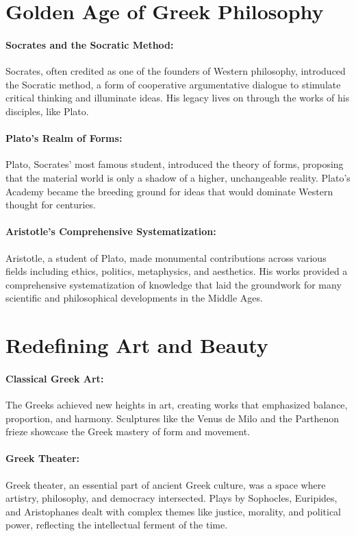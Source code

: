 \documentclass[a4paper,12pt]{book}
\begin{document}
\section*{Golden Age of Greek Philosophy}

\paragraph{Socrates and the Socratic Method:}
Socrates, often credited as one of the founders of Western philosophy, introduced the Socratic method, a form of cooperative argumentative dialogue to stimulate critical thinking and illuminate ideas. His legacy lives on through the works of his disciples, like Plato.

\paragraph{Plato’s Realm of Forms:}
Plato, Socrates’ most famous student, introduced the theory of forms, proposing that the material world is only a shadow of a higher, unchangeable reality. Plato’s Academy became the breeding ground for ideas that would dominate Western thought for centuries.

\paragraph{Aristotle’s Comprehensive Systematization:}
Aristotle, a student of Plato, made monumental contributions across various fields including ethics, politics, metaphysics, and aesthetics. His works provided a comprehensive systematization of knowledge that laid the groundwork for many scientific and philosophical developments in the Middle Ages.

\section*{Redefining Art and Beauty}

\paragraph{Classical Greek Art:}
The Greeks achieved new heights in art, creating works that emphasized balance, proportion, and harmony. Sculptures like the Venus de Milo and the Parthenon frieze showcase the Greek mastery of form and movement.

\paragraph{Greek Theater:}
Greek theater, an essential part of ancient Greek culture, was a space where artistry, philosophy, and democracy intersected. Plays by Sophocles, Euripides, and Aristophanes dealt with complex themes like justice, morality, and political power, reflecting the intellectual ferment of the time.
\end{document}
